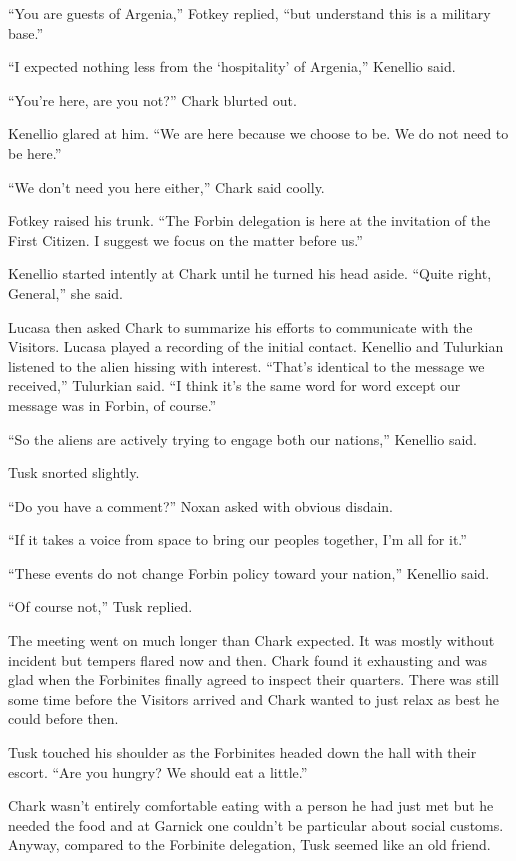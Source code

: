 ``You are guests of Argenia,'' Fotkey replied, ``but understand this is a military base.''

``I expected nothing less from the `hospitality' of Argenia,'' Kenellio said.

``You're here, are you not?'' Chark blurted out.

Kenellio glared at him. ``We are here because we choose to be. We do not need to be here.''

``We don't need you here either,'' Chark said coolly.

Fotkey raised his trunk. ``The Forbin delegation is here at the invitation of the First Citizen.
I suggest we focus on the matter before us.''

Kenellio started intently at Chark until he turned his head aside. ``Quite right, General,'' she
said.

Lucasa then asked Chark to summarize his efforts to communicate with the Visitors. Lucasa played
a recording of the initial contact. Kenellio and Tulurkian listened to the alien hissing with
interest. ``That's identical to the message we received,'' Tulurkian said. ``I think it's the
same word for word except our message was in Forbin, of course.''

``So the aliens are actively trying to engage both our nations,'' Kenellio said.

Tusk snorted slightly.

``Do you have a comment?'' Noxan asked with obvious disdain.

``If it takes a voice from space to bring our peoples together, I'm all for it.''

``These events do not change Forbin policy toward your nation,'' Kenellio said.

``Of course not,'' Tusk replied.

The meeting went on much longer than Chark expected. It was mostly without incident but tempers
flared now and then. Chark found it exhausting and was glad when the Forbinites finally agreed
to inspect their quarters. There was still some time before the Visitors arrived and Chark
wanted to just relax as best he could before then.

Tusk touched his shoulder as the Forbinites headed down the hall with their escort. ``Are you
hungry? We should eat a little.''

Chark wasn't entirely comfortable eating with a person he had just met but he needed the food
and at Garnick one couldn't be particular about social customs. Anyway, compared to the
Forbinite delegation, Tusk seemed like an old friend.

